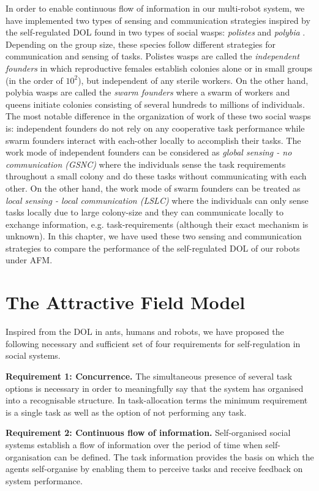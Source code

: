 \documentclass{intech}
\begin{document}
In order to enable continuous flow of information in our multi-robot system, we have implemented two types of sensing and communication strategies inspired by the self-regulated DOL found in two types of social wasps: {\em polistes} and {\em polybia} \citep{Jeanne1999}. Depending on the group size, these species follow different strategies for communication and sensing of tasks. Polistes wasps are called the {\em independent founders} in which reproductive females establish colonies alone or in small groups (in the order of $10^2$), but independent of any sterile workers. On the other hand, polybia wasps are called the {\em swarm founders} where a swarm of workers and queens initiate colonies consisting of several hundreds to millions of individuals. The most notable difference in the organization of work of these two social wasps is: independent founders do not rely on any cooperative task performance while swarm founders interact with each-other locally to accomplish their tasks. The work mode of independent founders can be considered as {\em global sensing - no communication (GSNC)} where the individuals sense the task requirements throughout a small colony and do these tasks without communicating with each other. On the other hand, the work mode of swarm founders can be treated as {\em local sensing - local communication (LSLC)} where the individuals can only sense tasks locally due to large colony-size and they can communicate locally to exchange information, e.g. task-requirements (although their exact mechanism is unknown). In this chapter, we have used these two sensing and communication strategies to compare the performance of the self-regulated DOL of our robots under AFM.
\section{The Attractive Field Model}
\label{afm:framework}
Inspired from the DOL in ants, humans and robots, we have proposed the following necessary and sufficient set of four requirements for self-regulation in social systems.

\textbf{Requirement 1: Concurrence.} The simultaneous presence of several task options is necessary in order to meaningfully say that the system has organised into a recognisable structure.   In task-allocation terms the minimum requirement is a single task as well as the option of not performing any task.

\textbf{Requirement 2: Continuous flow of information.} Self-organised social systems establish a flow of information over the period of time when self-organisation can be defined.  The task information provides the basis on which the agents self-organise by enabling them to perceive tasks and receive feedback on system performance.
\end{document}
